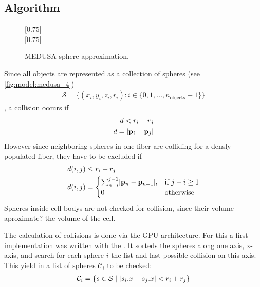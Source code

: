 \subsection{Algorithm}
%
\begin{figure}[!t]
    \centering
    \setlength{\tikzwidth}{0.75\textwidth}
    [0.75\textwidth]{
    }
    \\[2em]
    [0.75\textwidth]{
    }
    \caption{\ac{MEDUSA} sphere approximation.}
    \label{fig:medusaCell}
\end{figure}
%
Since all objects are represented as a collection of spheres (see \cref{fig:model:medusa_4})
\begin{align}
    \mathcal{S} = \{ (x_i,y_i,z_i,r_i) : i \in \{0, 1, ..., n_\text{objects}-1\}  \}
\end{align}
%
, a collision occurs if
%
\begin{align}
\begin{split}
d<r_i+r_j\\
d = \lvert\mathbf{p}_i - \mathbf{p}_j\rvert
\end{split}
\end{align}
%
However since neighboring spheres in one fiber are colliding for a densly populated fiber, they have to be excluded if
\begin{align}
\begin{split}
d(i,j) &\leq  r_i + r_j\\
d(i,j) &=
\begin{cases}
\sum_{n=i}^{j-1} \lvert\mathbf{p}_n - \mathbf{p}_{n+1}\rvert,& \text{if } j-i \geq 1\\
0 & \text{otherwise}
\end{cases}
\end{split}
\end{align}
%
Spheres inside cell bodys are not checked for collision, since their volume aproximate? the volume of the cell.
\par
%
The calculation of collisions is done via the GPU architecture. For this a first implementation was written with the  \cite{Karras2012}. It sorteds the spheres along one axis, \obda{} x-axis, and search for each sphere $i$ the fist and last possible collision on this axis.
This yield in a list of spheres $\mathcal{C}_i$ to be checked:
\begin{align}
\begin{split}
\mathcal{C}_i = \{ s \in \mathcal{S} \mid \lvert s_i.x - s_j.x\rvert < r_i+r_j \}
\end{split}
\end{align}
